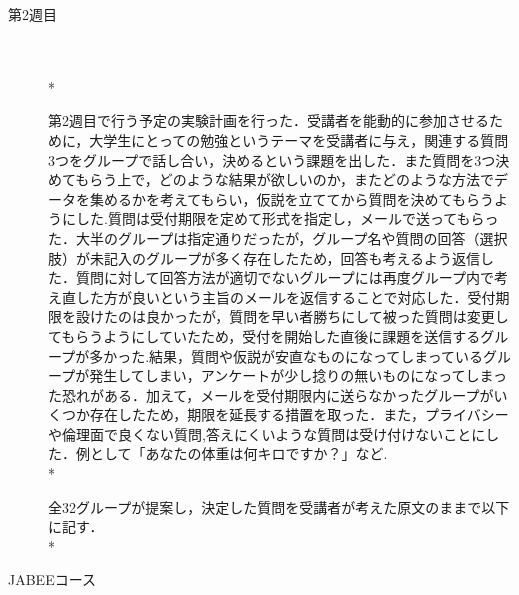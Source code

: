 \newpage


\begin{description}
 \item[第2週目]\mbox{}\\  \vspace{0.1in} \\*

	  第2週目で行う予定の実験計画を行った．受講者を能動的に参加させるために，大学生にとっての勉強というテーマを受講者に与え，関連する質問3つをグループで話し合い，決めるという課題を出した．また質問を3つ決めてもらう上で，どのような結果が欲しいのか，またどのような方法でデータを集めるかを考えてもらい，仮説を立ててから質問を決めてもらうようにした.質問は受付期限を定めて形式を指定し，メールで送ってもらった．大半のグループは指定通りだったが，グループ名や質問の回答（選択肢）が未記入のグループが多く存在したため，回答も考えるよう返信した．質問に対して回答方法が適切でないグループには再度グループ内で考え直した方が良いという主旨のメールを返信することで対応した．受付期限を設けたのは良かったが，質問を早い者勝ちにして被った質問は変更してもらうようにしていたため，受付を開始した直後に課題を送信するグループが多かった.結果，質問や仮説が安直なものになってしまっているグループが発生してしまい，アンケートが少し捻りの無いものになってしまった恐れがある．加えて，メールを受付期限内に送らなかったグループがいくつか存在したため，期限を延長する措置を取った．また，プライバシーや倫理面で良くない質問,答えにくいような質問は受け付けないことにした．例として「あなたの体重は何キロですか？」など.  \vspace{0.1in} \\*


全32グループが提案し，決定した質問を受講者が考えた原文のままで以下に記す． \vspace{0.1in} \\*

\end{description}


\begin{description}
 \item[JABEEコース]\mbox{}\\
\end{description}


